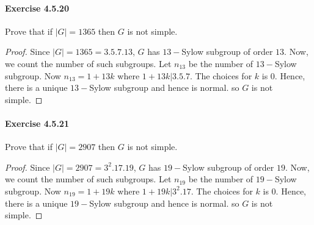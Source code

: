 \documentclass{article}
\theoremstyle{definition}
\begin{document}
\paragraph{Exercise 4.5.20} Prove that if $|G|=1365$ then $G$ is not simple.
\begin{proof}    
Since $|G|=1365=3.5.7.13$, $G$ has $13-$Sylow subgroup of order $13$. Now, we count the number of such subgroups. Let $n_{13}$ be the number of $13-$Sylow subgroup. Now $n_{13}=1+13k$ where $1+13k|3.5.7$. The choices for $k$ is $0$. Hence, there is a unique $13-$Sylow subgroup and hence is normal. so $G$ is not simple.
\end{proof}



\paragraph{Exercise 4.5.21} Prove that if $|G|=2907$ then $G$ is not simple.
\begin{proof}    
Since $|G|=2907=3^{2}.17.19$, $G$ has $19-$Sylow subgroup of order $19$. Now, we count the number of such subgroups. Let $n_{19}$ be the number of $19-$Sylow subgroup. Now $n_{19}=1+19k$ where $1+19k|3^{2}.17$. The choices for $k$ is $0$. Hence, there is a unique $19-$Sylow subgroup and hence is normal. so $G$ is not simple.
\end{proof}
\end{document}
